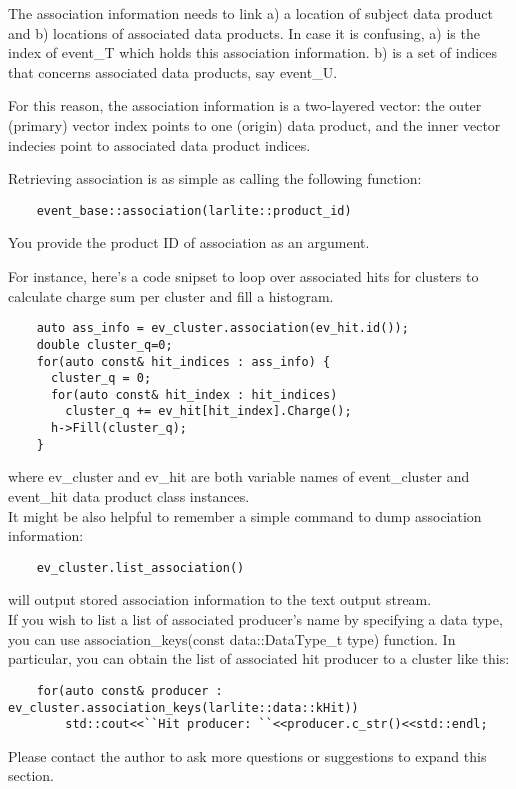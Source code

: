 The association information needs to link a) a location of subject data product and b) locations of associated data products.
In case it is confusing, a) is the index of {\ttfamily event\_T} which holds this association information.
b) is a set of indices that concerns associated data products, say {\ttfamily event\_U}.

For this reason, the association information is a two-layered vector: the outer (primary) vector index points to one (origin) data product, and the inner vector indecies point to associated data product indices. 

Retrieving association is as simple as calling the following function:
\begin{lstlisting}
    event_base::association(larlite::product_id)
\end{lstlisting}
You provide the product ID of association as an argument.

For instance, here's a code snipset to loop over associated hits for clusters to calculate charge sum per cluster and fill a histogram.
\begin{lstlisting}
    auto ass_info = ev_cluster.association(ev_hit.id());
    double cluster_q=0;
    for(auto const& hit_indices : ass_info) {
      cluster_q = 0;
      for(auto const& hit_index : hit_indices)
        cluster_q += ev_hit[hit_index].Charge();
      h->Fill(cluster_q);
    }
\end{lstlisting}
where {\ttfamily ev\_cluster} and {\ttfamily ev\_hit} are both variable names of {\ttfamily event\_cluster} and {\ttfamily event\_hit} data product class instances. \\

It might be also helpful to remember a simple command to dump association information:
\begin{lstlisting}
    ev_cluster.list_association()
\end{lstlisting}
will output stored association information to the text output stream. \\

If you wish to list a list of associated producer's name by specifying a data type, you can use
{\ttfamily association\_keys(const data::DataType\_t type)} function. In particular, you can obtain
the list of associated hit producer to a cluster like this:
\begin{lstlisting}
    for(auto const& producer : ev_cluster.association_keys(larlite::data::kHit))
        std::cout<<``Hit producer: ``<<producer.c_str()<<std::endl;
\end{lstlisting}
Please contact the author to ask more questions or suggestions to expand this section.
